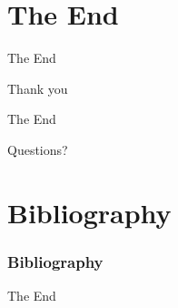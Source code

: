\documentclass[hideothersubsections]{beamer}
\begin{document}
\section{The End}

\begin{frame}{The End}
\begin{center}
\Huge Thank you
\end{center}
\end{frame}

\begin{frame}{The End}
\begin{center}
\Huge Questions?
\end{center}
\end{frame}


\section{Bibliography}
\begin{frame}[allowframebreaks]
	\frametitle{Bibliography}
	\nocite{*} 
	 
	
\end{frame}

\clearpage


\begin{frame}
\Huge{\centerline{The End}}
\end{frame}

\end{document}

